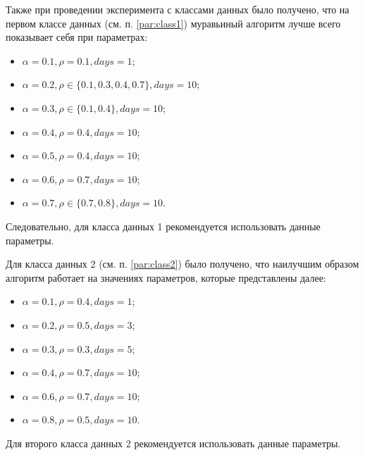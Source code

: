 Также при проведении эксперимента с классами данных было получено, что на первом классе данных (см. п. \ref{par:class1}) муравьиный алгоритм лучше всего показывает себя при параметрах:
\begin{itemize}[label=---]
	\item $\alpha = 0.1, \rho = 0.1, days = 1$;
	\item $\alpha = 0.2, \rho \in \{0.1, 0.3, 0.4, 0.7\}, days = 10$;
	\item $\alpha = 0.3, \rho \in \{0.1, 0.4\}, days = 10$;
	\item $\alpha = 0.4, \rho = 0.4, days = 10$;
	\item $\alpha = 0.5, \rho = 0.4, days = 10$;
	\item $\alpha = 0.6, \rho = 0.7, days = 10$;
	\item $\alpha = 0.7, \rho \in \{0.7, 0.8\}, days = 10$.
\end{itemize}  

Следовательно, для класса данных 1 рекомендуется использовать данные параметры. 

Для класса данных 2 (см. п. \ref{par:class2}) было получено, что наилучшим образом алгоритм работает на значениях параметров, которые представлены далее:
\begin{itemize}[label=---]
	\item $\alpha = 0.1, \rho = 0.4, days = 1$;
	\item $\alpha = 0.2, \rho = 0.5, days = 3$;
	\item $\alpha = 0.3, \rho = 0.3, days = 5$;
	\item $\alpha = 0.4, \rho = 0.7, days = 10$;
	\item $\alpha = 0.6, \rho = 0.7, days = 10$;
	\item $\alpha = 0.8, \rho = 0.5, days = 10$.
\end{itemize} 

Для второго класса данных 2 рекомендуется использовать данные параметры.
